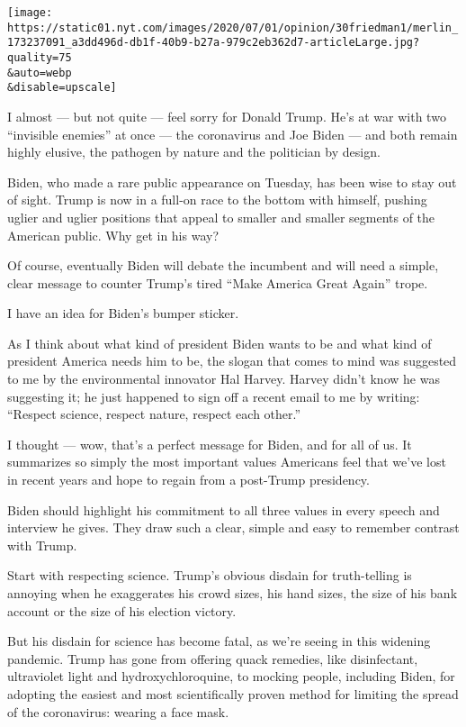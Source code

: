\texttt{[image: https://static01.nyt.com/images/2020/07/01/opinion/30friedman1/merlin\_173237091\_a3dd496d-db1f-40b9-b27a-979c2eb362d7-articleLarge.jpg?quality=75\\\&auto=webp\\\&disable=upscale]}

I almost --- but not quite --- feel sorry for Donald Trump. He's at war
with two ``invisible enemies'' at once --- the coronavirus and Joe Biden
--- and both remain highly elusive, the pathogen by nature and the
politician by design.

Biden, who made a rare public appearance on Tuesday, has been wise to
stay out of sight. Trump is now in a full-on race to the bottom with
himself, pushing uglier and uglier positions that appeal to smaller and
smaller segments of the American public. Why get in his way?

Of course, eventually Biden will debate the incumbent and will need a
simple, clear message to counter Trump's tired ``Make America Great
Again'' trope.

I have an idea for Biden's bumper sticker.

As I think about what kind of president Biden wants to be and what kind
of president America needs him to be, the slogan that comes to mind was
suggested to me by the environmental innovator Hal Harvey. Harvey didn't
know he was suggesting it; he just happened to sign off a recent email
to me by writing: ``Respect science, respect nature, respect each
other.''

I thought --- wow, that's a perfect message for Biden, and for all of
us. It summarizes so simply the most important values Americans feel
that we've lost in recent years and hope to regain from a post-Trump
presidency.

Biden should highlight his commitment to all three values in every
speech and interview he gives. They draw such a clear, simple and easy
to remember contrast with Trump.

Start with respecting science. Trump's obvious disdain for truth-telling
is annoying when he exaggerates his crowd sizes, his hand sizes, the
size of his bank account or the size of his election victory.

But his disdain for science has become fatal, as we're seeing in this
widening pandemic. Trump has gone from offering quack remedies, like
disinfectant, ultraviolet light and hydroxychloroquine, to mocking
people, including Biden, for adopting the easiest and most
scientifically proven method for limiting the spread of the coronavirus:
wearing a face mask.

